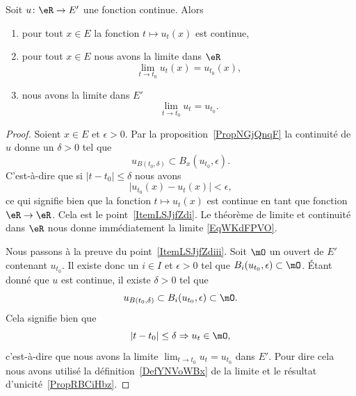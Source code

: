 \begin{proposition} \label{PropVKSNflB}
	Soit \( u\colon \eR\to E'\) une fonction continue. Alors
	\begin{enumerate}
		\item   \label{ItemLSJjfZdi}
		      pour tout \( x\in E\) la fonction \( t\mapsto u_t(x)\) est continue,
		\item\label{ItemLSJjfZdii}
		      pour tout \( x\in E\) nous avons la limite dans \( \eR\)
		      \begin{equation}    \label{EqWKdFPVO}
			      \lim_{t\to t_0} u_t(x)=u_{t_0}(x),
		      \end{equation}
		\item\label{ItemLSJjfZdiii}
		      nous avons la limite dans \( E'\)
		      \begin{equation}
			      \lim_{t\to t_0} u_t=u_{t_0}.
		      \end{equation}
	\end{enumerate}
\end{proposition}

\begin{proof}
	Soient \( x\in E\) et \( \epsilon> 0\). Par la proposition~\ref{PropNGjQnqF} la continuité de \( u\) donne un \( \delta>0\) tel que
	\begin{equation}
		u_{B(t_0,\delta)}\subset B_x(u_{t_0},\epsilon).
	\end{equation}
	C'est-à-dire que si \( | t-t_0 |\leq \delta\) nous avons
	\begin{equation}
		\big| u_{t_0}(x)-u_t(x) \big|<\epsilon,
	\end{equation}
	ce qui signifie bien que la fonction \( t\mapsto u_t(x)\) est continue en tant que fonction \( \eR\to \eR\). Cela est le point~\ref{ItemLSJjfZdi}. Le théorème de limite et continuité dans \( \eR\) nous donne immédiatement la limite \eqref{EqWKdFPVO}.

	Nous passons à la preuve du point~\ref{ItemLSJjfZdiii}. Soit \( \mO\) un ouvert de \( E'\) contenant \( u_{t_0}\). Il existe donc un \( i\in I\) et \( \epsilon>0\) tel que \( B_i(u_{t_0},\epsilon)\subset \mO\). Étant donné que \( u\) est continue, il existe \( \delta>0\) tel que
	\begin{equation}
		u_{B(t_0,\delta)}\subset B_i(u_{t_0},\epsilon)\subset \mO.
	\end{equation}
	Cela signifie bien que
	\begin{equation}
		| t-t_0 |\leq \delta\Rightarrow u_t\in\mO,
	\end{equation}
	c'est-à-dire que nous avons la limite \( \lim_{t\to t_0} u_t=u_{t_0}\) dans \( E'\). Pour dire cela nous avons utilisé la définition~\ref{DefYNVoWBx} de la limite et le résultat d'unicité~\ref{PropRBCiHbz}.
\end{proof}

